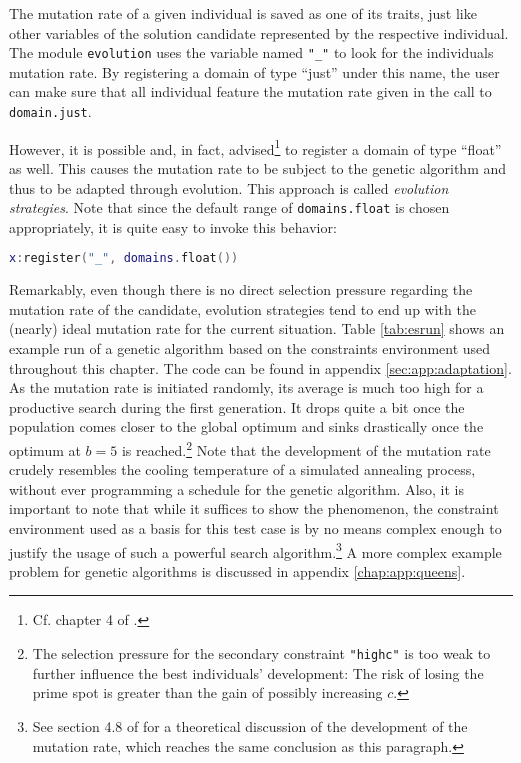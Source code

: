 The mutation rate of a given individual is saved as one of its traits, just like other variables of the solution candidate represented by the respective individual. The module \texttt{evolution} uses the variable named \texttt{"\_"} to look for the individuals mutation rate. By registering a domain of type ``just'' under this name, the user can make sure that all individual feature the mutation rate given in the call to \texttt{domain.just}.

However, it is possible and, in fact, advised\footnote{Cf. chapter 4 of \cite{EibenSmith2007}.} to register a domain of type ``float'' as well. This causes the mutation rate to be subject to the genetic algorithm and thus to be adapted through evolution. This approach is called \emph{evolution strategies}. Note that since the default range of \texttt{domains.float} is chosen appropriately, it is quite easy to invoke this behavior:

\begin{lstlisting}[language=lua, caption={Letting the genetic algorithm adapt the mutation rate.}, label=lst:floatmutationrate, name=lst:floatmutationrate]
x:register("_", domains.float())
\end{lstlisting}

Remarkably, even though there is no direct selection pressure regarding the mutation rate of the candidate, evolution strategies tend to end up with the (nearly) ideal mutation rate for the current situation. Table \ref{tab:esrun} shows an example run of a genetic algorithm based on the constraints environment used throughout this chapter. The code can be found in appendix \ref{sec:app:adaptation}. As the mutation rate is initiated randomly, its average is much too high for a productive search during the first generation. It drops quite a bit once the population comes closer to the global optimum and sinks drastically once the optimum at $b=5$ is reached.\footnote{The selection pressure for the secondary constraint \texttt{"highc"} is too weak to further influence the best individuals' development: The risk of losing the prime spot is greater than the gain of possibly increasing $c$.} Note that the development of the mutation rate crudely resembles the cooling temperature of a simulated annealing process, without ever programming a schedule for the genetic algorithm. Also, it is important to note that while it suffices to show the phenomenon, the constraint environment used as a basis for this test case is by no means complex enough to justify the usage of such a powerful search algorithm.\footnote{See section 4.8 of \cite{EibenSmith2007} for a theoretical discussion of the development of the mutation rate, which reaches the same conclusion as this paragraph.} A more complex example problem for genetic algorithms is discussed in appendix \ref{chap:app:queens}.

